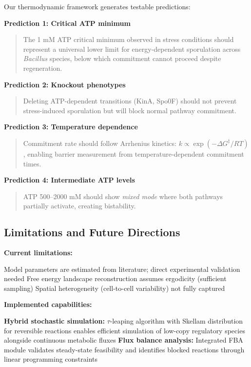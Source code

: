 \documentclass[twocolumn,11pt]{article}
\begin{document}
Our thermodynamic framework generates testable predictions:

\textbf{Prediction 1: Critical ATP minimum}
\begin{quote}
    The 1 mM ATP critical minimum observed in stress conditions should represent a universal lower limit for energy-dependent sporulation across \textit{Bacillus} species, below which commitment cannot proceed despite regeneration.
\end{quote}

\textbf{Prediction 2: Knockout phenotypes}
\begin{quote}
    Deleting ATP-dependent transitions (KinA, Spo0F) should not prevent stress-induced sporulation but will block normal pathway commitment.
\end{quote}

\textbf{Prediction 3: Temperature dependence}
\begin{quote}
    Commitment rate should follow Arrhenius kinetics: $k \propto \exp(-\Delta G^\ddagger / RT)$, enabling barrier measurement from temperature-dependent commitment times.
\end{quote}

\textbf{Prediction 4: Intermediate ATP levels}
\begin{quote}
    ATP 500--2000 mM should show \textit{mixed mode} where both pathways partially activate, creating bistability.
\end{quote}

\subsection{Limitations and Future Directions}

\textbf{Current limitations:}

Model parameters are estimated from literature; direct experimental validation needed
Free energy landscape reconstruction assumes ergodicity (sufficient sampling)
Spatial heterogeneity (cell-to-cell variability) not fully captured


\textbf{Implemented capabilities:}

\textbf{Hybrid stochastic simulation:} $\tau$-leaping algorithm with Skellam distribution for reversible reactions enables efficient simulation of low-copy regulatory species alongside continuous metabolic fluxes
\textbf{Flux balance analysis:} Integrated FBA module validates steady-state feasibility and identifies blocked reactions through linear programming constraints
\end{document}
